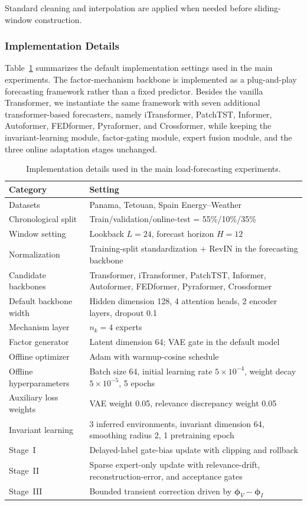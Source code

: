 ﻿\documentclass[journal]{IEEEtran}
\begin{document}
Standard cleaning and interpolation are applied when needed before sliding-window construction.

\subsubsection{Implementation Details}
Table~\ref{tab:impl_details} summarizes the default implementation settings used in the main experiments. The factor-mechanism backbone is implemented as a plug-and-play forecasting framework rather than a fixed predictor. Besides the vanilla Transformer, we instantiate the same framework with seven additional transformer-based forecasters, namely iTransformer, PatchTST, Informer, Autoformer, FEDformer, Pyraformer, and Crossformer, while keeping the invariant-learning module, factor-gating module, expert fusion module, and the three online adaptation stages unchanged.

\begin{table}[t]
\caption{Implementation details used in the main load-forecasting experiments.}
\label{tab:impl_details}
\centering
\begin{tabular}{ll}
\toprule
Category & Setting \\
\midrule
Datasets & Panama, Tetouan, Spain Energy--Weather \\
Chronological split & Train/validation/online-test = 55\%/10\%/35\% \\
Window setting & Lookback $L=24$, forecast horizon $H=12$ \\
Normalization & Training-split standardization + RevIN in the forecasting backbone \\
Candidate backbones & Transformer, iTransformer, PatchTST, Informer, Autoformer, FEDformer, Pyraformer, Crossformer \\
Default backbone width & Hidden dimension 128, 4 attention heads, 2 encoder layers, dropout 0.1 \\
Mechanism layer & $n_k=4$ experts \\
Factor generator & Latent dimension 64; VAE gate in the default model \\
Offline optimizer & Adam with warmup-cosine schedule \\
Offline hyperparameters & Batch size 64, initial learning rate $5\times 10^{-4}$, weight decay $5\times 10^{-5}$, 5 epochs \\
Auxiliary loss weights & VAE weight 0.05, relevance discrepancy weight 0.05 \\
Invariant learning & 3 inferred environments, invariant dimension 64, smoothing radius 2, 1 pretraining epoch \\
Stage~I & Delayed-label gate-bias update with clipping and rollback \\
Stage~II & Sparse expert-only update with relevance-drift, reconstruction-error, and acceptance gates \\
Stage~III & Bounded transient correction driven by $\boldsymbol{\phi}_V-\boldsymbol{\phi}_I$ \\
\bottomrule
\end{tabular}
\end{table}
\end{document}
